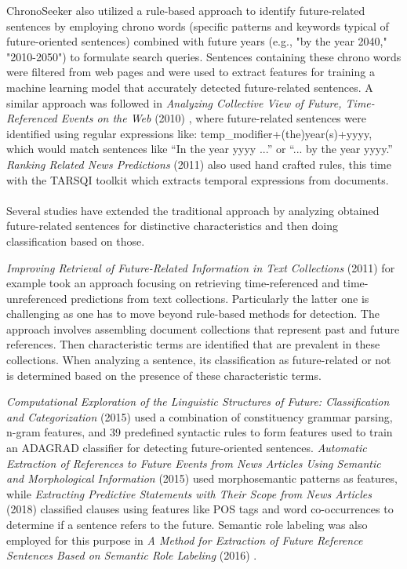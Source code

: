\documentclass[a4paper,10pt]{report}
\begin{document}
ChronoSeeker \cite{KawaiChronoseeker} also utilized a rule-based approach to identify future-related sentences by employing chrono words (specific patterns and keywords typical of future-oriented sentences) combined with future years (e.g., "by the year 2040," "2010-2050") to formulate search queries. Sentences containing these chrono words were filtered from web pages and were used to extract features for training a machine learning model that accurately detected future-related sentences.
A similar approach was followed in \textit{Analyzing Collective View of Future, Time-Referenced Events on the Web} (2010) \cite{JatowtAnalyzingCollective}, where future-related sentences were identified using regular expressions like: temp\_modifier+(the)year(s)+yyyy, which would match sentences like “In the year yyyy ...” or “... by the year yyyy.” 
\textit{Ranking Related News Predictions} (2011) \cite{KanhabuaRanking} also used hand crafted rules, this time with the TARSQI toolkit which extracts temporal expressions from documents. 
\\\\
Several studies have extended the traditional approach by analyzing obtained future-related sentences for distinctive characteristics and then doing classification based on those.

\textit{Improving Retrieval of Future-Related Information in Text Collections} (2011) \cite{KanazawaImproving} for example took an approach focusing on retrieving time-referenced and time-unreferenced predictions from text collections. Particularly the latter one is challenging as one has to move beyond rule-based methods for detection. The approach involves assembling document collections that represent past and future references. Then characteristic terms are identified that are prevalent in these collections. When analyzing a sentence, its classification as future-related or not is determined based on the presence of these characteristic terms.

\textit{Computational Exploration of the Linguistic Structures of Future: Classification and Categorization} (2015) \cite{NiComputationalExploration} used a combination of constituency grammar parsing, n-gram features, and 39 predefined syntactic rules to form features used to train an ADAGRAD classifier for detecting future-oriented sentences. \textit{Automatic Extraction of References to Future Events from News Articles Using Semantic and Morphological Information} (2015) \cite{NakajimaAutomaticExtraction} used morphosemantic patterns as features, while \textit{Extracting Predictive Statements with Their Scope from News Articles} (2018) \cite{YarrabellyExtractingPredictive} classified clauses using features like POS tags and word co-occurrences to determine if a sentence refers to the future. Semantic role labeling was also employed for this purpose in \textit{A Method for Extraction of Future Reference Sentences Based on Semantic Role  Labeling} (2016) \cite{NakajimaMethod}. \\
\end{document}
